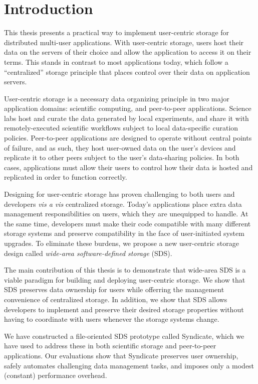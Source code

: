 \chapter{Introduction}
\label{chap:introduction}

This thesis presents a practical way to 
implement user-centric storage
for distributed multi-user applications.
With user-centric storage, users host their
data on the servers of their choice and allow
the application to access it on their terms.
This stands in contrast to most
applications today, which follow a ``centralized'' storage principle
that places control over their data on application servers.

User-centric storage is a necessary data organizing principle in two major
application domains:  scientific computing, and peer-to-peer applications.
Science labs host and curate the data generated by local experiments, and share
it with remotely-executed scientific workflows subject to local data-specific curation
policies.  Peer-to-peer applications are designed to operate without central
points of failure, and as such, they host
user-owned data on the user's devices and replicate it to other peers subject to
the user's data-sharing policies.  In both cases, applications must allow
their users to control how their data is hosted and replicated in order to
function correctly.

Designing for user-centric storage has proven challenging to both users and
developers \emph{vis a vis} centralized storage.
Today's applications place extra data management
responsibilities on users, which they are unequipped to handle.
At the same time, developers must make their
code compatible with many different storage systems and preserve compatibility
in the face of user-initiated system upgrades.
To eliminate these burdens, we
propose a new user-centric storage design called \emph{wide-area
software-defined storage} (SDS).

The main contribution of this thesis is to demonstrate that wide-area SDS 
is a viable paradigm for building and deploying user-centric storage. 
We show that SDS preserves data ownership for users while offerring
the management convenience of centralized storage.
In addition, we show that SDS allows developers to implement and preserve
their desired storage properties without having to coordinate with users
whenever the storage systems change.

We have constructed a file-oriented SDS prototype called Syndicate,
which we have used to address
these in both scientific storage and peer-to-peer
applications.  Our evaluations show that Syndicate
preserves user ownership, safely automates
challenging data management tasks, and imposes only a modest
(constant) performance overhead.


